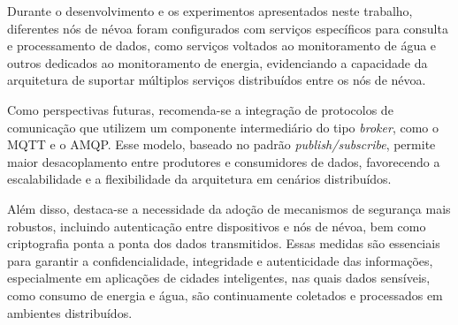 Durante o desenvolvimento e os experimentos apresentados neste trabalho, diferentes nós de névoa foram configurados com serviços específicos para consulta e processamento de dados, como serviços voltados ao monitoramento de água e outros dedicados ao monitoramento de energia, evidenciando a capacidade da arquitetura de suportar múltiplos serviços distribuídos entre os nós de névoa. 

Como perspectivas futuras, recomenda-se a integração de protocolos de comunicação que utilizem um componente intermediário do tipo \textit{broker}, como o \gls{MQTT} e o \gls{AMQP}. Esse modelo, baseado no padrão \textit{publish/subscribe}, permite maior desacoplamento entre produtores e consumidores de dados, favorecendo a escalabilidade e a flexibilidade da arquitetura em cenários distribuídos.

Além disso, destaca-se a necessidade da adoção de mecanismos de segurança mais robustos, incluindo autenticação entre dispositivos e nós de névoa, bem como criptografia ponta a ponta dos dados transmitidos. Essas medidas são essenciais para garantir a confidencialidade, integridade e autenticidade das informações, especialmente em aplicações de cidades inteligentes, nas quais dados sensíveis, como consumo de energia e água, são continuamente coletados e processados em ambientes distribuídos.
